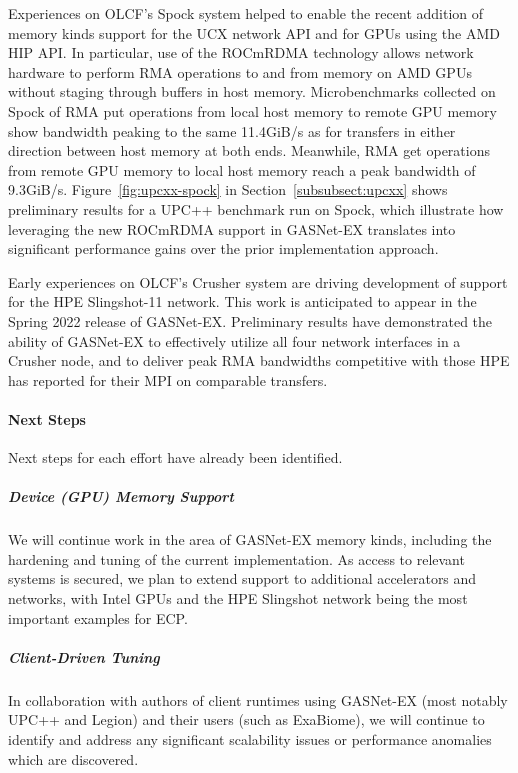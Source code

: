 Experiences on OLCF's Spock system helped to enable the recent addition of
memory kinds support for the UCX network API and for GPUs using the AMD HIP API.
In particular, use of the ROCmRDMA technology allows network hardware to
perform RMA operations to and from memory on AMD GPUs without staging through
buffers in host memory.
%
Microbenchmarks collected on Spock of RMA put operations from local host memory
to remote GPU memory show bandwidth peaking to the same 11.4GiB/s as for
transfers in either direction between host memory at both ends.
Meanwhile, RMA get operations from remote GPU memory to local host memory reach
a peak bandwidth of 9.3GiB/s.  
%
Figure~\ref{fig:upcxx-spock} in Section~\ref{subsubsect:upcxx}
shows preliminary results for a UPC++ benchmark run on Spock, which illustrate
how leveraging the new ROCmRDMA support in GASNet-EX translates into significant
performance gains over the prior implementation approach.

Early experiences on OLCF's Crusher system are driving development of support
for the HPE Slingshot-11 network.  This work is anticipated to appear in the
Spring 2022 release of GASNet-EX.  Preliminary results have demonstrated the
ability of GASNet-EX to effectively utilize all four network interfaces in a
Crusher node, and to deliver peak RMA bandwidths competitive with those HPE
has reported for their MPI on comparable transfers.

\paragraph{Next Steps}

Next steps for each effort have already been identified.

\subparagraph{Device (GPU) Memory Support}
We will continue work in the area of GASNet-EX memory kinds, including the
hardening and tuning of the current implementation.
As access to relevant systems is secured, we plan to extend support to
additional accelerators and networks, with Intel GPUs and the HPE Slingshot
network being the most important examples for ECP.

\subparagraph{Client-Driven Tuning}
In collaboration with authors of client runtimes using GASNet-EX (most notably
UPC++ and Legion) and their users (such as ExaBiome), we will continue to
identify and address any significant scalability issues or performance
anomalies which are discovered.

